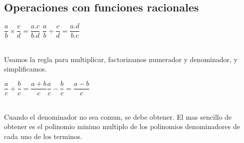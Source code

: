 \documentclass[10pt]{article}
\begin{document}
\subsection{Operaciones con funciones racionales}
\begin{multicols}{2}
\begin{mdframed}[roundcorner=5pt]
\begin{center}
$\dfrac{a}{b} \times \dfrac{c}{d} = \dfrac{a.c}{b.d}$ \hspace{.5cm} $\dfrac{a}{b} \div \dfrac{c}{d} = \dfrac{a.d}{b.c}$\\ \
\end{center}
Usamos la regla para multiplicar, factorizamos numerador y denominador, y simplificamos.\\
\end{mdframed}

\begin{mdframed}[roundcorner=5pt]
\begin{center}
$\dfrac{a}{c}+\dfrac{b}{c}=\dfrac{a+b}{c}$\hspace{.5cm}$\dfrac{a}{c}-\dfrac{b}{c}=\dfrac{a-b}{c}$\\ \
\end{center}
Cuando el denominador no sea comun, se debe obtener. El mas sencillo de obtener es el polinomio minimo multiplo de los polinomios denominadores de cada uno de los terminos.
\end{mdframed}
\end{multicols}
\end{document}
